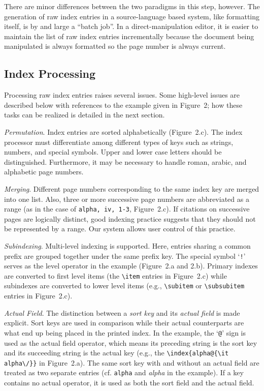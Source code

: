 There are minor differences between the two paradigms in this step,
however.  The generation of raw index entries in a source-language based
system, like formatting itself, is by and large a ``batch job''.
In a direct-manipulation editor, it is easier to maintain the list of raw index entries
incrementally because the document being manipulated is always formatted
so the page number is always current.

\subsection{Index Processing}
Processing raw index entries raises several issues.
Some high-level issues are described below with references to the example given
in Figure~2; how these tasks can be realized is detailed in the next section.

{\it Permutation\/}.  Index entries are sorted alphabetically (Figure~2.c).
The index processor must differentiate among different types of keys
such as strings, numbers, and special symbols.
Upper and lower case letters should be distinguished.
Furthermore, it may be necessary to handle roman, arabic, and
alphabetic page numbers.

{\it Merging\/}.  Different page numbers corresponding to the same
index key are merged into one list.  Also, three or more
successive page numbers are abbreviated as a range (as in the
case of \verb|alpha, iv, 1-3|, Figure~2.c).  If citations on successive
pages are logically distinct, good indexing practice suggests that they
should not be represented by a range.  Our system allows user control
of this practice.

{\it Subindexing\/}.  Multi-level indexing is supported.
Here, entries sharing a common prefix are grouped together
under the same prefix key.
The special symbol `\verb|!|' serves as the level operator
in the example (Figure~2.a and 2.b).  Primary indexes are
converted to first level items (the \verb|\item| entries in Figure~2.c)
while subindexes are converted to lower level items
(e.g., \verb|\subitem| or \verb|\subsubitem| entries in Figure~2.c).

{\it Actual Field\/}.  The distinction between a {\it sort key\/}
and its	{\it actual field\/} is made explicit.
Sort keys are used in comparison while their actual counterparts are
what end up being placed in the printed index.
In the example, the `\verb|@|'
sign is used as the actual field operator, which means its
preceding string is the sort key and its succeeding string
is the actual key (e.g., the \verb|\index{alpha@{\it alpha\/}}|
in Figure~2.a).
The same sort key with and without an actual field
are treated as two separate entries (cf. \verb|alpha| and {\it alpha\/}
in the example).  If a key contains no actual operator,
it is used as both the sort field and the actual field.


